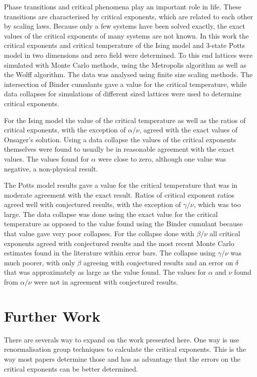 \documentclass[11pt, a4paper]{report} %
\begin{document}
Phase transitions and critical phenomena play an important role in life.
These transitions are characterised by critical exponents, which are related to each other by scaling laws.
Because only a few systems have been solved exactly, the exact values of the critical exponents of many systems are not known.
In this work the critical exponents and critical temperature of the Ising model and 3-state Potts model in two dimensions and zero field were determined.
To this end lattices were simulated with Monte Carlo methods, using the Metropolis algorithm as well as the Wolff algorithm.
The data was analysed using finite size scaling methods.
The intersection of Binder cumulants gave a value for the critical temperature, while data collapses for simulations of different sized lattices were used to determine critical exponents.

For the Ising model the value of the critical temperature as well as the ratios of critical exponents, with the exception of \(\alpha/\nu\), agreed with the exact values of Onsager's solution.
Using a data collapse the values of the critical exponents themselves were found to usually be in reasonable agreement with the exact values. The values found for \(\alpha\) were close to zero, although one value was negative, a non-physical result.

The Potts model results gave a value for the critical temperature that was in moderate agreement with the exact result.
Ratios of critical exponent ratios agreed well with conjectured results, with the exception of \(\gamma/\nu\), which was too large.
The data collapse was done using the exact value for the critical temperature as opposed to the value found using the Binder cumulant because that value gave very poor collapses.
For the collapse done with \(\beta/\nu\) all critical exponents agreed with conjectured results and the most recent Monte Carlo estimates found in the literature within error bars.
The collapse using \(\gamma/\nu\) was much poorer, with only \(\beta\) agreeing with conjectured results and an error on \(\delta\) that was approximately as large as the value found.
The values for \(\alpha\) and \(\nu\) found from \(\alpha/\nu\) were not in agreement with conjectured results.


\section{Further Work}
There are severals way to expand on the work presented here.
One way is use renormalisation group techniques to calculate the critical exponents.
This is the way most papers determine those and has as advantage that the errors on the critical exponents can be better determined.
\end{document}
